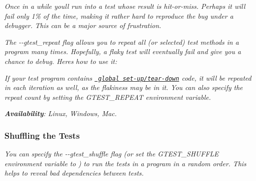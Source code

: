 {\itshape }

{\itshape Once in a while you\textquotesingle{}ll run into a test whose result is hit-\/or-\/miss. Perhaps it will fail only 1\% of the time, making it rather hard to reproduce the bug under a debugger. This can be a major source of frustration.}

{\itshape The {\ttfamily -\/-\/gtest\+\_\+repeat} flag allows you to repeat all (or selected) test methods in a program many times. Hopefully, a flaky test will eventually fail and give you a chance to debug. Here\textquotesingle{}s how to use it\+:}

{\itshape 
\begin{DoxyCode}{0}
\DoxyCodeLine{}
\DoxyCodeLine{}
\DoxyCodeLine{}
\end{DoxyCode}
}

{\itshape If your test program contains \href{\#global-set-up-and-tear-down}{\texttt{ global set-\/up/tear-\/down}} code, it will be repeated in each iteration as well, as the flakiness may be in it. You can also specify the repeat count by setting the {\ttfamily G\+T\+E\+S\+T\+\_\+\+R\+E\+P\+E\+AT} environment variable.}

{\itshape {\bfseries{Availability}}\+: Linux, Windows, Mac.}

{\itshape \subsubsection*{Shuffling the Tests}}

{\itshape }

{\itshape You can specify the {\ttfamily -\/-\/gtest\+\_\+shuffle} flag (or set the {\ttfamily G\+T\+E\+S\+T\+\_\+\+S\+H\+U\+F\+F\+LE} environment variable to {}) to run the tests in a program in a random order. This helps to reveal bad dependencies between tests.}

